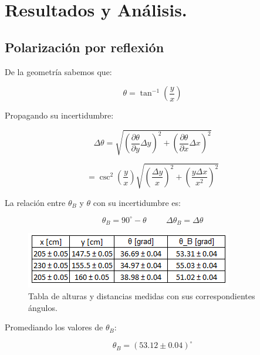 \documentclass[DIV=calc, paper=a4, fontsize=10pt]{scrartcl}
\begin{document}
\section*{\textcolor{carmine}{Resultados y Análisis.}}

\subsection*{\textcolor{carmine}{Polarización por reflexión}}

De la geometría sabemos que:

\begin{equation*}
    \theta = \tan^{-1}{\left(\frac{y}{x}\right)}
\end{equation*}

Propagando su incertidumbre:

\begin{equation*}
    \Delta \theta = \sqrt{\left(\frac{\partial \theta}{\partial y}\Delta y\right)^{2}+ \left(\frac{\partial \theta}{\partial x} \Delta x\right)^{2}}
\end{equation*}

\begin{equation*}
    = \csc^{2}{\left(\frac{y}{x}\right)}\sqrt{\left(\frac{\Delta y}{x}\right)^{2} + \left(\frac{y \Delta x}{x^{2}}\right)^{2}}
\end{equation*}

La relación entre $\theta_{B}$ y $\theta$ con su incertidumbre es:

\begin{equation*}
    \theta_{B} = 90^{\circ}-\theta \hspace{1cm} \Delta \theta_{B} = \Delta \theta
\end{equation*}

\begin{figure}[H]
    \centering
    \includegraphics{tablas/tabla 1.PNG}
    \caption{Tabla de alturas y distancias medidas con sus correspondientes ángulos.}
    \label{fig:my_label}
\end{figure}

Promediando los valores de $\theta_{B}$:

\begin{equation*}
    \theta_{B}= (53.12 \pm 0.04)^{\circ}
\end{equation*}
\end{document}
